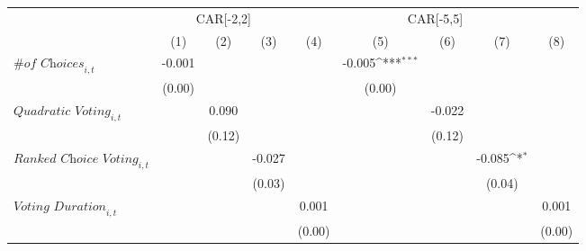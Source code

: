 {
\def\sym#1{\ifmmode^{#1}\else\(^{#1}\)\fi}
\begin{tabular}{l*{8}{c}}
\toprule
                    &\multicolumn{3}{c}{CAR[-2,2]}                                    &\multicolumn{5}{c}{CAR[-5,5]}                                                                                \\\cmidrule(lr){2-4}\cmidrule(lr){5-9}
                    &\multicolumn{1}{c}{(1)}         &\multicolumn{1}{c}{(2)}         &\multicolumn{1}{c}{(3)}         &\multicolumn{1}{c}{(4)}         &\multicolumn{1}{c}{(5)}         &\multicolumn{1}{c}{(6)}         &\multicolumn{1}{c}{(7)}         &\multicolumn{1}{c}{(8)}         \\
\midrule
$\textit{\# of Choices}_{i,t}$&      -0.001         &                     &                     &                     &      -0.005\sym{***}&                     &                     &                     \\
                    &      (0.00)         &                     &                     &                     &      (0.00)         &                     &                     &                     \\
$\textit{Quadratic Voting}_{i,t}$&                     &       0.090         &                     &                     &                     &      -0.022         &                     &                     \\
                    &                     &      (0.12)         &                     &                     &                     &      (0.12)         &                     &                     \\
$\textit{Ranked Choice Voting}_{i,t}$&                     &                     &      -0.027         &                     &                     &                     &      -0.085\sym{*}  &                     \\
                    &                     &                     &      (0.03)         &                     &                     &                     &      (0.04)         &                     \\
$\textit{Voting Duration}_{i,t}$&                     &                     &                     &       0.001         &                     &                     &                     &       0.001         \\
                    &                     &                     &                     &      (0.00)         &                     &                     &                     &      (0.00)         \\

\end{tabular}}
